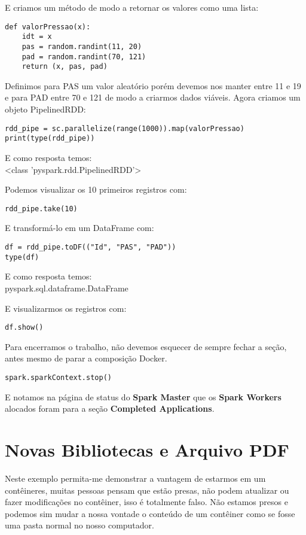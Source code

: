E criamos um método de modo a retornar os valores como uma lista:
\begin{lstlisting}[]
def valorPressao(x):
    idt = x
    pas = random.randint(11, 20)
    pad = random.randint(70, 121)
    return (x, pas, pad)
\end{lstlisting}

Definimos para PAS um valor aleatório porém devemos nos manter entre 11 e 19 e para PAD entre 70 e 121 de modo a criarmos dados viáveis. Agora criamos um objeto PipelinedRDD:
\begin{lstlisting}[]
rdd_pipe = sc.parallelize(range(1000)).map(valorPressao)
print(type(rdd_pipe))
\end{lstlisting}

E como resposta temos: \\
{\ttfamily <class 'pyspark.rdd.PipelinedRDD'>}

Podemos visualizar os 10 primeiros registros com:
\begin{lstlisting}[]
rdd_pipe.take(10)
\end{lstlisting}

E transformá-lo em um DataFrame com:
\begin{lstlisting}[]
df = rdd_pipe.toDF(("Id", "PAS", "PAD"))
type(df)
\end{lstlisting}

E como resposta temos: \\
{\ttfamily pyspark.sql.dataframe.DataFrame}

E visualizarmos os registros com:
\begin{lstlisting}[]
df.show()
\end{lstlisting}

Para encerramos o trabalho, não devemos esquecer de sempre fechar a seção, antes mesmo de parar a composição Docker.
\begin{lstlisting}[]
spark.sparkContext.stop()
\end{lstlisting}

E notamos na página de status do \textbf{Spark Master} que os \textbf{Spark Workers} alocados foram para a seção \textbf{Completed Applications}.


\section{Novas Bibliotecas e Arquivo PDF}
Neste exemplo permita-me demonstrar a vantagem de estarmos em um contêineres, muitas pessoas pensam que estão presas, não podem atualizar ou fazer modificações no contêiner, isso é totalmente falso. Não estamos presos e podemos sim mudar a nossa vontade o conteúdo de um contêiner como se fosse uma pasta normal no nosso computador.

